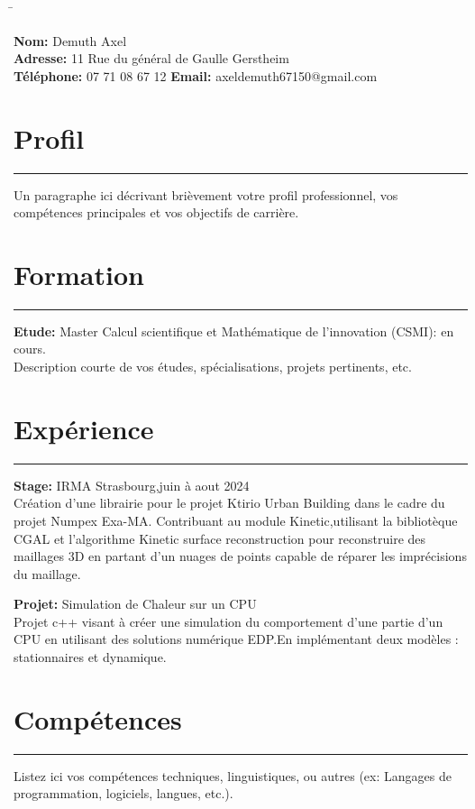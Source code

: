 \documentclass[a4paper,10pt]{article}
\newcommand{\personalinfo}[1]{
    \noindent
    \begin{tabbing}
    \hspace{2cm} \= \kill
    #1
    \end{tabbing}
}
\newcommand{\sectionline}{
    \noindent\rule{\textwidth}{0.5pt}
}
\begin{document}
\personalinfo{
    \textbf{Nom:} Demuth Axel \\
    \textbf{Adresse:} 11 Rue du général de Gaulle Gerstheim  \\
    \textbf{Téléphone:} 07 71 08 67 12
    \textbf{Email:} axeldemuth67150@gmail.com
}

\section*{Profil}
\sectionline
Un paragraphe ici décrivant brièvement votre profil professionnel, vos compétences principales et vos objectifs de carrière.

\section*{Formation}
\sectionline
\textbf{Etude:} Master Calcul scientifique et Mathématique de l'innovation (CSMI): en cours.\\
Description courte de vos études, spécialisations, projets pertinents, etc.

\section*{Expérience}
\sectionline
\textbf{Stage: } IRMA Strasbourg,juin à aout 2024  \\
Création d'une librairie pour le projet Ktirio Urban Building dans le cadre du projet Numpex Exa-MA.
Contribuant au module Kinetic,utilisant la bibliotèque CGAL et l'algorithme Kinetic surface reconstruction 
pour reconstruire des maillages 3D en partant d'un nuages de points capable de réparer les imprécisions du maillage.

\noindent
\textbf{Projet: } Simulation de Chaleur sur un CPU\\
Projet c++ visant à créer une simulation du comportement d'une partie d'un CPU en utilisant des solutions numérique EDP.En implémentant deux modèles : stationnaires et dynamique.


\section*{Compétences}
\sectionline
Listez ici vos compétences techniques, linguistiques, ou autres (ex: Langages de programmation, logiciels, langues, etc.).
\end{document}
